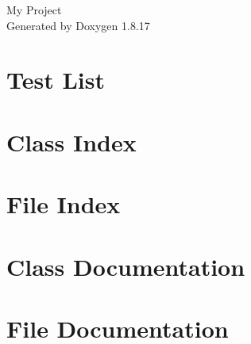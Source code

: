 \let\mypdfximage\pdfximage\def\pdfximage{\immediate\mypdfximage}\documentclass[twoside]{book}
\newcommand{\+}{\discretionary{\mbox{\scriptsize$\hookleftarrow$}}{}{}}
\newcommand{\clearemptydoublepage}{%
  \newpage{\pagestyle{empty}\cleardoublepage}%
}
\begin{document}
\hypersetup{pageanchor=false,
             bookmarksnumbered=true,
             pdfencoding=unicode
            }
\begin{titlepage}
\vspace*{7cm}
\begin{center}%
{\Large My Project }\\
\vspace*{1cm}
{\large Generated by Doxygen 1.8.17}\\
\end{center}
\end{titlepage}
\clearemptydoublepage
{}
\tableofcontents
\clearemptydoublepage
{}
\hypersetup{pageanchor=true}

\chapter{Test List}
\label{test}

\chapter{Class Index}

\chapter{File Index}

\chapter{Class Documentation}









\chapter{File Documentation}






































\backmatter
\newpage
{}
\clearemptydoublepage
{}
\printindex
\end{document}
